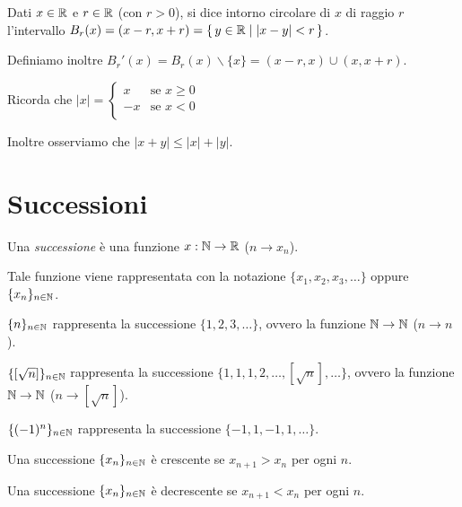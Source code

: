 \begin{definition}
Dati $x \in \mathbb R$ e $r \in \mathbb R$ (con $r > 0$), si dice intorno circolare di $x$ di raggio $r$ l'intervallo $B_r(x) = (x-r, x+r) = \set{y \in \mathbb R| |x-y| < r}$.


Definiamo inoltre $B_r'(x) = B_r(x)\backslash\{x\} = (x-r, x) \cup (x, x+r)$.
\end{definition}

Ricorda che $|x| = 
\begin{cases} 
x & \mbox{se } x \ge 0 \\
-x & \mbox{se } x < 0 \\ 
\end{cases} $

Inoltre osserviamo che $|x+y| \le |x| + |y|$.

\section{Successioni}

Una \emph{successione} è una funzione $x:\mathbb N \rightarrow \mathbb R$ ($n \rightarrow x_n$).

Tale funzione viene rappresentata con la notazione $\{x_1, x_2, x_3, \dots\}$ oppure $\{x_n\}_{n \in \mathbb N}$.

\begin{example}
$\{n\}_{n \in \mathbb N}$ rappresenta la successione $\{1, 2, 3, \dots \}$, ovvero la funzione $\mathbb N \rightarrow \mathbb N$ ($n \rightarrow n$).
\end{example}

\begin{example}
$\{[\sqrt{n}]\}_{n \in \mathbb N}$ rappresenta la successione $\{1, 1, 1, 2, \dots, [\sqrt{n}], \dots \}$, ovvero la funzione $\mathbb N \rightarrow \mathbb N$ ($n \rightarrow [\sqrt{n}]$).
\end{example}

\begin{example}
$\{(-1)^n\}_{n \in \mathbb N}$ rappresenta la successione $\{-1, 1, -1, 1, \dots \}$.
\end{example}

\begin{definition}
Una successione $\{x_n\}_{n \in \mathbb N}$ è crescente se $x_{n+1} > x_n$ per ogni $n$.
\end{definition}

\begin{definition}
Una successione $\{x_n\}_{n \in \mathbb N}$ è decrescente se $x_{n+1} < x_n$ per ogni $n$.
\end{definition}

